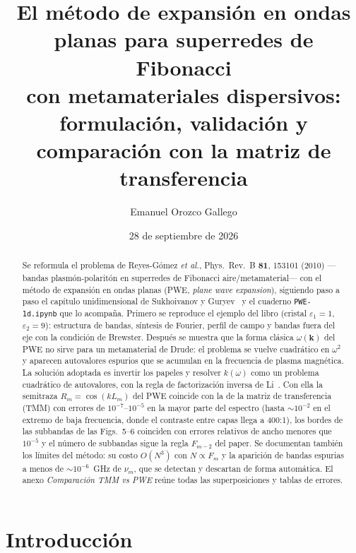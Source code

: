 \documentclass[11pt,a4paper]{article}
\title{El método de expansión en ondas planas para superredes de Fibonacci\\
con metamateriales dispersivos:\\
formulación, validación y comparación con la matriz de transferencia}
\author{Emanuel Orozco Gallego}
\date{28 de septiembre de 2026}
\newcommand{\code}[1]{\texttt{#1}}
\begin{document}
\maketitle

\begin{abstract}
Se reformula el problema de Reyes-Gómez \textit{et al.}, Phys.\ Rev.\ B
\textbf{81}, 153101 (2010) ---bandas plasmón-polaritón en superredes de
Fibonacci aire/metamaterial--- con el método de expansión en ondas planas
(PWE, \textit{plane wave expansion}), siguiendo paso a paso el capítulo
unidimensional de Sukhoivanov y Guryev~\cite{sukhoivanov} y el cuaderno
\code{PWE-1d.ipynb} que lo acompaña. Primero se reproduce el ejemplo del libro
(cristal $\varepsilon_1=1$, $\varepsilon_2=9$): estructura de bandas, síntesis
de Fourier, perfil de campo y bandas fuera del eje con la condición de
Brewster. Después se muestra que la forma clásica $\omega(\mathbf{k})$ del PWE
no sirve para un metamaterial de Drude: el problema se vuelve cuadrático en
$\omega^2$ y aparecen autovalores espurios que se acumulan en la frecuencia de
plasma magnética. La solución adoptada es invertir los papeles y resolver
$k(\omega)$ como un problema cuadrático de autovalores, con la regla de
factorización inversa de Li~\cite{li1996}. Con ella la semitraza
$R_m=\cos(kL_m)$ del PWE coincide con la de la matriz de transferencia (TMM)
con errores de $10^{-7}$--$10^{-5}$ en la mayor parte del espectro (hasta
$\sim\!10^{-2}$ en el extremo de baja frecuencia, donde el contraste entre capas
llega a 400:1), los bordes de las subbandas de las Figs.~5--6
coinciden con errores relativos de ancho menores que $10^{-5}$ y el número de
subbandas sigue la regla $F_{m-2}$ del paper. Se documentan también los límites
del método: su costo $O(N^3)$ con $N\propto F_m$ y la aparición de bandas
espurias a menos de $\sim\!10^{-6}$~GHz de $\nu_m$, que se detectan y descartan
de forma automática. El anexo \textit{Comparación TMM vs PWE} reúne todas las
superposiciones y tablas de errores.
\end{abstract}

\tableofcontents
\newpage

\section{Introducción}
\end{document}
